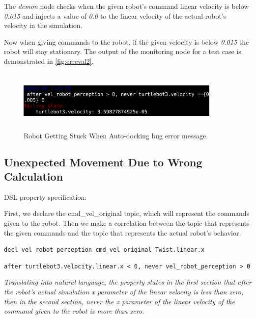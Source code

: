 The \textit{demon} node checks when the given robot's command linear velocity is below \textit{0.015} and injects a value of \textit{0.0} to the linear velocity of the actual robot's velocity in the simulation.

Now when giving commands to the robot, if the given velocity is below \textit{0.015} the robot will stay stationary. The output of the monitoring node for a test case is demonstrated in \autoref{fig:erreval2}.

\begin{figure}
\begin{center}
\includegraphics[width=10cm,height=3cm,keepaspectratio,]{images/erreval2.png}
\caption{Robot Getting Stuck When Auto-docking bug error message.} \label{fig:erreval2}
\end{center}
\end{figure}


\subsection{Unexpected Movement Due to Wrong Calculation}
\label{ssec:unexpectedmovementduetowrongcalculation}

DSL property specification:

First, we declare the cmd\_vel\_original topic, which will represent the commands given to the robot.
Then we make a correlation between the topic that represents the given commands and the topic that represents the actual robot's behavior.

\texttt{decl vel\_robot\_perception cmd\_vel\_original Twist.linear.x}

\texttt{after turtlebot3.velocity.linear.x < 0, never vel\_robot\_perception > 0}

\textit{Translating into natural language, the property states in the first section that after the robot's actual simulation x parameter of the linear velocity is less than zero, then in the second section, never the x parameter of the linear velocity of the command given to the robot is more than zero.}

